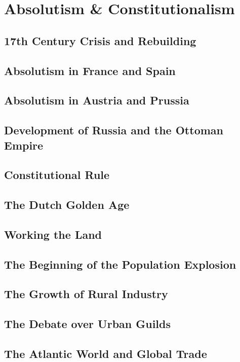 \documentclass[../euro.tex]{subfiles}
\begin{document}
\chapter{Absolutism \& Constitutionalism}
\section{17th Century Crisis and Rebuilding}
\section{Absolutism in France and Spain}
\section{Absolutism in Austria and Prussia}
\section{Development of Russia and the Ottoman Empire}
\section{Constitutional Rule}
\section{The Dutch Golden Age}
\section{Working the Land}
\section{The Beginning of the Population Explosion}
\section{The Growth of Rural Industry}
\section{The Debate over Urban Guilds}
\section{The Atlantic World and Global Trade}
\end{document}
